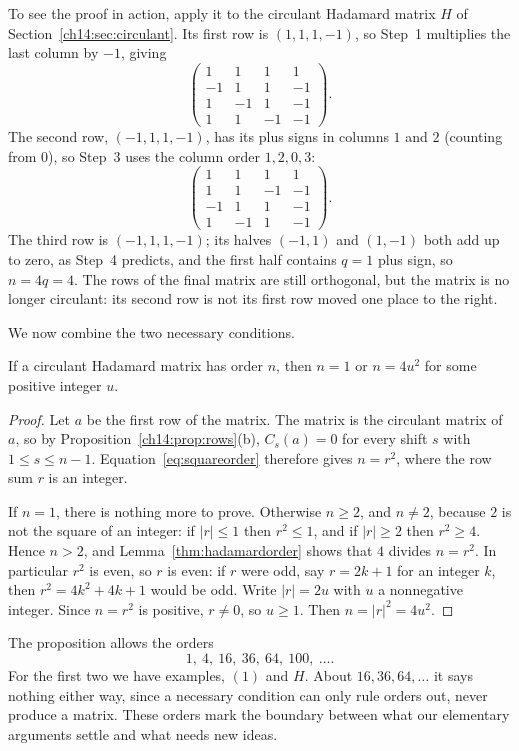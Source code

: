 To see the proof in action, apply it to the circulant Hadamard matrix $H$ of Section~\ref{ch14:sec:circulant}. Its first row is $(1,1,1,-1)$, so Step~1 multiplies the last column by $-1$, giving
\[
\begin{pmatrix}
1&1&1&1\\
-1&1&1&-1\\
1&-1&1&-1\\
1&1&-1&-1
\end{pmatrix}.
\]
The second row, $(-1,1,1,-1)$, has its plus signs in columns $1$ and $2$ (counting from $0$), so Step~3 uses the column order $1,2,0,3$:
\[
\begin{pmatrix}
1&1&1&1\\
1&1&-1&-1\\
-1&1&1&-1\\
1&-1&1&-1
\end{pmatrix}.
\]
The third row is $(-1,1,1,-1)$; its halves $(-1,1)$ and $(1,-1)$ both add up to zero, as Step~4 predicts, and the first half contains $q=1$ plus sign, so $n=4q=4$. The rows of the final matrix are still orthogonal, but the matrix is no longer circulant: its second row is not its first row moved one place to the right.

We now combine the two necessary conditions.

\par\noindent\begin{minipage}{\linewidth}
\begin{proposition}\label{thm:circulantnecessary}
If a circulant Hadamard matrix has order $n$, then $n=1$ or $n=4u^2$ for some positive integer $u$.
\end{proposition}
\end{minipage}\par

\begin{proof}
Let $a$ be the first row of the matrix. The matrix is the circulant matrix of $a$, so by Proposition~\ref{ch14:prop:rows}(b), $C_s(a)=0$ for every shift $s$ with $1\le s\le n-1$. Equation~\eqref{eq:squareorder} therefore gives $n=r^2$, where the row sum $r$ is an integer.

If $n=1$, there is nothing more to prove. Otherwise $n\ge2$, and $n\ne2$, because $2$ is not the square of an integer: if $|r|\le1$ then $r^2\le1$, and if $|r|\ge2$ then $r^2\ge4$. Hence $n>2$, and Lemma~\ref{thm:hadamardorder} shows that $4$ divides $n=r^2$. In particular $r^2$ is even, so $r$ is even: if $r$ were odd, say $r=2k+1$ for an integer $k$, then $r^2=4k^2+4k+1$ would be odd. Write $|r|=2u$ with $u$ a nonnegative integer. Since $n=r^2$ is positive, $r\ne0$, so $u\ge1$. Then $n=|r|^2=4u^2$.
\end{proof}

The proposition allows the orders
\[
1,\ 4,\ 16,\ 36,\ 64,\ 100,\ \ldots.
\]
For the first two we have examples, $(1)$ and $H$. About $16,36,64,\ldots$ it says nothing either way, since a necessary condition can only rule orders out, never produce a matrix. These orders mark the boundary between what our elementary arguments settle and what needs new ideas.
